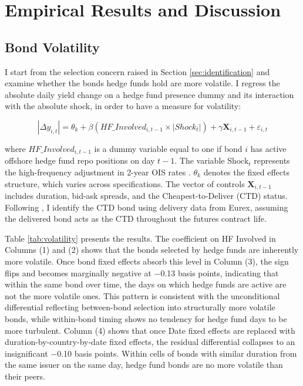 \documentclass[english, 11pt, oneside]{article}
\begin{document}
\section{Empirical Results and Discussion}
\label{sec:empirical_results}

\subsection{Bond Volatility}
\label{subsec:volatility}
I start from the selection concern raised in Section \ref{sec:identification} and examine whether the bonds hedge funds hold are more volatile. I regress the absolute daily yield change on a hedge fund presence dummy and its interaction with the absolute shock, in order to have a measure for volatility:

\begin{equation}
    |\Delta y_{i,t}| = \theta_{k} + \beta (HF\_Involved_{i,t-1} \times |Shock_{t}|) + \gamma \mathbf{X}_{i,t-1} + \varepsilon_{i,t}
\end{equation}

where $HF\_Involved_{i,t-1}$ is a dummy variable equal to one if bond $i$ has active offshore hedge fund repo positions on day $t-1$. The variable $\text{Shock}_{t}$ represents the high-frequency adjustment in 2-year OIS rates \citep{altavilla2019}. $\theta_{k}$ denotes the fixed effects structure, which varies across specifications. The vector of controls $\mathbf{X}_{i,t-1}$ includes duration, bid-ask spreads, and the Cheapest-to-Deliver (CTD) status. Following \citet{pelizzon2025}, I identify the CTD bond using delivery data from Eurex, assuming the delivered bond acts as the CTD throughout the futures contract life.

Table \ref{tab:volatility} presents the results. The coefficient on HF Involved in Columns (1) and (2) shows that the bonds selected by hedge funds are inherently more volatile. Once bond fixed effects absorb this level in Column (3), the sign flips and becomes marginally negative at $-$0.13 basis points, indicating that within the same bond over time, the days on which hedge funds are active are not the more volatile ones. This pattern is consistent with the unconditional differential reflecting between-bond selection into structurally more volatile bonds, while within-bond timing shows no tendency for hedge fund days to be more turbulent. Column (4) shows that once Date fixed effects are replaced with duration-by-country-by-date fixed effects, the residual differential collapses to an insignificant $-$0.10 basis points. Within cells of bonds with similar duration from the same issuer on the same day, hedge fund bonds are no more volatile than their peers.
\end{document}
